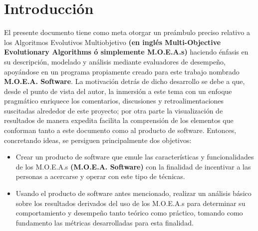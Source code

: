 \documentclass[class=report, crop=false]{standalone}
\begin{document}


\setcounter{page}{0}

\chapter{Introducción}
El presente documento tiene como meta otorgar un preámbulo 
preciso relativo a los Algoritmos Evolutivos Multiobjetivo \textbf{(en inglés Multi-Objective Evolutionary Algorithms ó
simplemente M.O.E.A.s)} haciendo énfasis en su descripción, 
modelado y análisis mediante evaluadores de desempeño, 
apoyándose en un programa propiamente creado para este 
trabajo nombrado \textbf{M.O.E.A. Software}.\medskip\break
La motivación detrás de dicho desarrollo se debe a que, 
desde el punto de vista del autor, la inmersión a este tema 
con un enfoque pragmático enriquece los comentarios, discusiones 
y retroalimentaciones suscitadas alrededor de este proyecto; 
por otra parte la visualización de resultados de manera expedita 
facilita la comprensión de los elementos que conforman tanto 
a este documento como al producto de software.\medskip\break
Entonces, concretando ideas, se persiguen principalmente dos 
objetivos:

\begin{itemize}
\item Crear un producto de software que emule las características 
y funcionalidades de los M.O.E.A.s \textbf{(M.O.E.A. Software)} 
con la finalidad de incentivar a las personas a acercarse y 
operar con este tipo de técnicas.
\item Usando el producto de software antes mencionado, realizar 
un análisis básico sobre los resultados derivados del uso de 
los M.O.E.A.s para determinar su comportamiento y desempeño 
tanto teórico como práctico, tomando como fundamento las 
métricas desarrolladas para esta finalidad.
\end{itemize}
\end{document}
